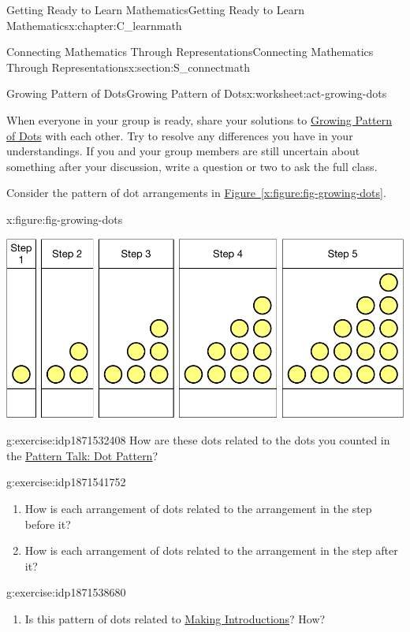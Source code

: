 \documentclass[oneside,10pt,]{book}
\newcommand{\xreffont}{\relax}
\numberwithin{equation}{chapter}
\begin{document}
\begin{chapterptx}{Getting Ready to Learn Mathematics}{}{Getting Ready to Learn Mathematics}{}{}{x:chapter:C_learnmath}
\begin{sectionptx}{Connecting Mathematics Through Representations}{}{Connecting Mathematics Through Representations}{}{}{x:section:S_connectmath}
\begin{worksheet-subsection}{Growing Pattern of Dots}{}{Growing Pattern of Dots}{}{}{x:worksheet:act-growing-dots}
\begin{introduction}{}
When everyone in your group is ready, share your solutions to \hyperref[x:worksheet:act-growing-dots]{Growing Pattern of Dots} with each other. Try to resolve any differences you have in your understandings. If you and your group members are still uncertain about something after your discussion, write a question or two to ask the full class.%
\par
Consider the pattern of dot arrangements in \hyperref[x:figure:fig-growing-dots]{Figure~{\xreffont\ref{x:figure:fig-growing-dots}}}.%
\begin{figureptx}{}{x:figure:fig-growing-dots}{}%
\begin{image}{0}{1}{0}%
\includegraphics[width=\linewidth]{external/growing-dots.pdf}
\end{image}%
\tcblower
\end{figureptx}%
\end{introduction}%
\begin{divisionexercise}{1}{}{}{g:exercise:idp1871532408}%
How are these dots related to the dots you counted in the \hyperref[x:subsection:SS_dot_pattern]{Pattern Talk: Dot Pattern}?%
\end{divisionexercise}%
\begin{divisionexercise}{2}{}{}{g:exercise:idp1871541752}%
\begin{enumerate}[font=\bfseries,label=(\alph*),ref=\alph*]
\item{}How is each arrangement of dots related to the arrangement in the step before it?%
\item{}How is each arrangement of dots related to the arrangement in the step after it?%
\end{enumerate}
\end{divisionexercise}%
\begin{divisionexercise}{3}{}{}{g:exercise:idp1871538680}%
\begin{enumerate}[font=\bfseries,label=(\alph*),ref=\alph*]
\item{}Is this pattern of dots related to \hyperref[x:activity:act-introductions]{Making Introductions}? How?%

\end{enumerate}
\end{divisionexercise}
\end{worksheet-subsection}
\end{sectionptx}
\end{chapterptx}
\end{document}
